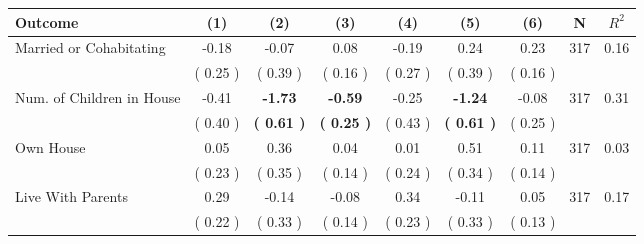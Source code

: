 \begin{tabular}{lcccccccc}
\toprule
 \textbf{Outcome} & \textbf{(1)} & \textbf{(2)} & \textbf{(3)} & \textbf{(4)} & \textbf{(5)} & \textbf{(6)} & \textbf{N} & \textbf{$ R^2$} \\
\midrule
Married or Cohabitating &     -0.18 &     -0.07 &      0.08 &     -0.19 &      0.24 &      0.23 & 317 &       0.16 \\ 
 & (     0.25 ) & (     0.39 ) & (     0.16 ) & (     0.27 ) & (     0.39 ) & (     0.16 ) & \\
Num. of Children in House &     -0.41 & \textbf{    -1.73} & \textbf{    -0.59} &     -0.25 & \textbf{    -1.24} &     -0.08 & 317 &       0.31 \\ 
 & (     0.40 ) & \textbf{(     0.61 )} & \textbf{(     0.25 )} & (     0.43 ) & \textbf{(     0.61 )} & (     0.25 ) & \\
Own House &      0.05 &      0.36 &      0.04 &      0.01 &      0.51 &      0.11 & 317 &       0.03 \\ 
 & (     0.23 ) & (     0.35 ) & (     0.14 ) & (     0.24 ) & (     0.34 ) & (     0.14 ) & \\
Live With Parents &      0.29 &     -0.14 &     -0.08 &      0.34 &     -0.11 &      0.05 & 317 &       0.17 \\ 
 & (     0.22 ) & (     0.33 ) & (     0.14 ) & (     0.23 ) & (     0.33 ) & (     0.13 ) & \\
\bottomrule
\end{tabular}
